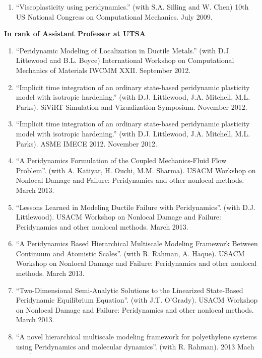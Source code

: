 \ifdefined\iscockrell
\begin{enumerate}
    \item ``Viscoplasticity using peridynamics.''  (with S.A. Silling and W. Chen) 10th US National Congress on Computational Mechanics. July 2009.
\end{enumerate}
    \pagebreak[2]
    \textbf{In rank of Assistant Professor at UTSA}
\begin{enumerate}[resume]
    \item ``Peridynamic Modeling of Localization in Ductile Metals.'' (with D.J. Littewood and B.L. Boyce)  International Workshop on Computational Mechanics of Materials IWCMM XXII. September 2012.
    \item ``Implicit time integration of an ordinary state-based peridynamic plasticity model with isotropic hardening.'' (with D.J. Littlewood, J.A. Mitchell, M.L. Parks).  SiViRT Simulation and Vizualization Symposium.  November 2012.
    \item ``Implicit time integration of an ordinary state-based peridynamic plasticity model with isotropic hardening.'' (with D.J. Littlewood, J.A. Mitchell, M.L. Parks).  ASME IMECE 2012.  November 2012.
    \item ``A Peridynamics Formulation of the Coupled Mechanics-Fluid Flow Problem''. (with A. Katiyar, H. Ouchi, M.M. Sharma). USACM Workshop on Nonlocal Damage and Failure: Peridynamics and other nonlocal methods. March 2013.
    \item ``Lessons Learned in Modeling Ductile Failure with Peridynamics''. (with D.J. Littlewood). USACM Workshop on Nonlocal Damage and Failure: Peridynamics and other nonlocal methods. March 2013.
    \item ``A Peridynamics Based Hierarchical Multiscale Modeling Framework Between Continuum and Atomistic Scales''. (with R. Rahman, A. Haque). USACM Workshop on Nonlocal Damage and Failure: Peridynamics and other nonlocal methods. March 2013.
    \item ``Two-Dimensional Semi-Analytic Solutions to the Linearized State-Based Peridynamic Equilibrium Equation''. (with J.T. O'Grady). USACM Workshop on Nonlocal Damage and Failure: Peridynamics and other nonlocal methods. March 2013.
    \item ``A novel hierarchical multiscale modeling framework for polyethylene systems using Peridynamics and molecular dynamics''. (with R. Rahman). 2013 Mach Conference, Annapolis, MD. April 2013. 
    \item ``A non-local formulation for fluid flow and mass transport in porous media based on peridynamic theory''. (with A.~Katiyar and M.~Sharma). 12th US National Congress on Computational Mechanics. July 2013.

\end{enumerate}
